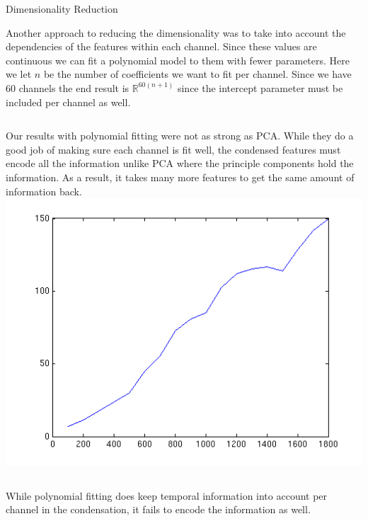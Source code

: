 \documentclass[final,t]{beamer}
\begin{document}
\begin{frame}{}
\begin{columns}[t]
\begin{column}{.3\linewidth}
\begin{block}{Dimensionality Reduction}
       \par
       Another approach to reducing the dimensionality was to take
       into account the dependencies of the features within each
       channel. Since these values are continuous we can fit a
       polynomial model to them with fewer parameters. Here we let $n$
       be the number of coefficients we want to fit per channel. Since
       we have 60 channels the end result is $\mathbb{R}^{60(n+1)}$
       since the intercept parameter must be included per channel as well.
       \begin{columns}[c]
       Our results with polynomial fitting were not as strong as
       PCA. While they do a good job of making sure each channel is
       fit well, the condensed features must encode all the
       information unlike PCA where the principle components hold the
       information. As a result, it takes many more features to get
       the same amount of information back.
       \includegraphics[width=0.97\linewidth]{images/dim_vs_runningtime.png}
     \end{columns}
     While polynomial fitting does keep temporal information into
     account per channel in the condensation, it fails to encode the
     information as well.

     \end{block}
   \end{column}
   
    

\end{columns}
\end{frame}
\end{document}

